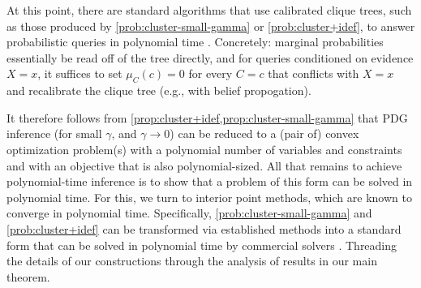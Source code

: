 \documentclass[twoside]{article}
\begin{document}
At this point, there are standard algorithms that use
calibrated clique trees, such as those produced by 
\eqref{prob:cluster-small-gamma} or \eqref{prob:cluster+idef},
to answer probabilistic queries in polynomial time \parencite[\S 10.3.3]{koller2009probabilistic}.
Concretely: marginal probabilities essentially be read off of the tree directly, 
and for queries conditioned on evidence $X{=}x$, it suffices 
to set $\mu_C(c) = 0$ for every $C{=}c$ that conflicts with $X{=}x$
and recalibrate the clique tree (e.g., with belief propogation).
%


%
It therefore
follows from \cref{prop:cluster+idef,prop:cluster-small-gamma} 
that PDG inference
(for small $\gamma$, and $\gamma \to 0$)
%
can be reduced to a (pair of) convex optimization problem(s) with a
polynomial number of variables and constraints and with an objective that is also polynomial-sized.
All that remains to achieve polynomial-time inference is to show that a problem of this form can be solved in polynomial time. For this, we turn to interior point methods, which are known \parencite{badenbroek2021algorithm} to converge in polynomial time.
Specifically, \eqref{prob:cluster-small-gamma} and \eqref{prob:cluster+idef} can be transformed via established methods \parencite{agrawal2018rewriting} into
a standard form
that
can be solved in polynomial time by commercial solvers \parencite{mosek,escoc}.
Threading the details of our constructions 
through the analysis of 
\textcite{dahl2022primal}
results in our main theorem. 
\end{document}
